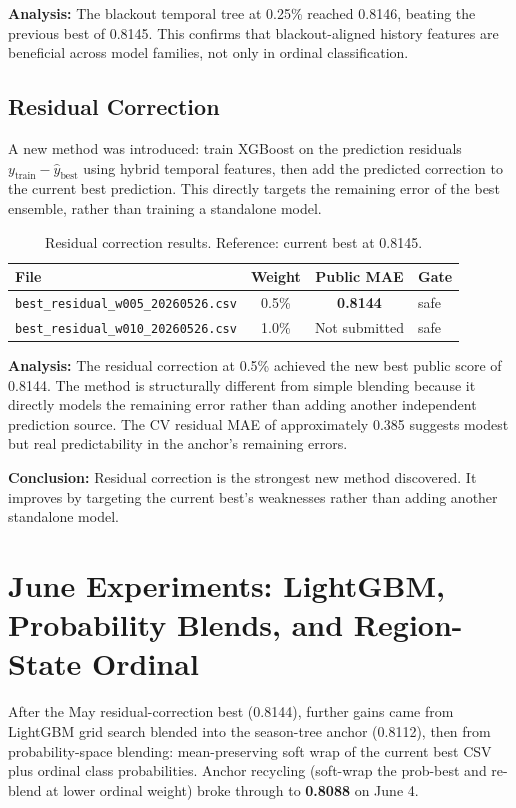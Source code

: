 \documentclass[12pt, a4paper]{article}
\begin{document}
\textbf{Analysis:} The blackout temporal tree at 0.25\% reached 0.8146, beating the previous best of 0.8145. This confirms that blackout-aligned history features are beneficial across model families, not only in ordinal classification.

\subsection{Residual Correction}
A new method was introduced: train XGBoost on the prediction residuals $y_{\text{train}} - \hat{y}_{\text{best}}$ using hybrid temporal features, then add the predicted correction to the current best prediction. This directly targets the remaining error of the best ensemble, rather than training a standalone model.

\begin{table}[H]
\centering
\caption{Residual correction results. Reference: current best at 0.8145.}
\label{tab:resid}
\begin{tabular}{@{}lccl@{}}
\toprule
\textbf{File} & \textbf{Weight} & \textbf{Public MAE} & \textbf{Gate} \\
\midrule
\texttt{best\_residual\_w005\_20260526.csv} & 0.5\% & \textbf{0.8144} & safe \\
\texttt{best\_residual\_w010\_20260526.csv} & 1.0\% & Not submitted & safe \\
\bottomrule
\end{tabular}
\end{table}

\textbf{Analysis:} The residual correction at 0.5\% achieved the new best public score of 0.8144. The method is structurally different from simple blending because it directly models the remaining error rather than adding another independent prediction source. The CV residual MAE of approximately 0.385 suggests modest but real predictability in the anchor's remaining errors.

\textbf{Conclusion:} Residual correction is the strongest new method discovered. It improves by targeting the current best's weaknesses rather than adding another standalone model.

\section{June Experiments: LightGBM, Probability Blends, and Region-State Ordinal}

After the May residual-correction best (0.8144), further gains came from LightGBM grid search blended into the season-tree anchor (0.8112), then from probability-space blending: mean-preserving soft wrap of the current best CSV plus ordinal class probabilities. Anchor recycling (soft-wrap the prob-best and re-blend at lower ordinal weight) broke through to \textbf{0.8088} on June 4.
\end{document}
